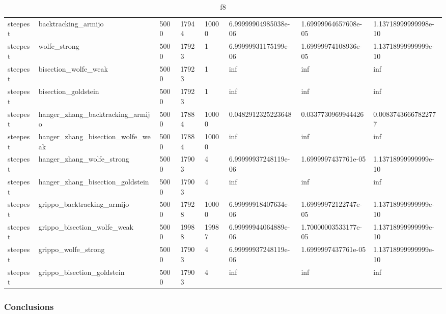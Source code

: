 \documentclass[a4paper,11pt]{article}
\numberwithin{equation}{section} %
\begin{document}
\begin{table}[h!]
{\begin{tabular}{|l|l|l|l|l|l|l|l|}
        steepest & backtracking\_armijo & 5000 & 17944 & 10000 & 6.99999904985038e-06 & 1.69999964657608e-05 & 1.13718999999998e-10 \\
        steepest & wolfe\_strong & 5000 & 17923 & 1 & 6.99999931175199e-06 & 1.69999974108936e-05 & 1.13718999999999e-10 \\
        steepest & bisection\_wolfe\_weak & 5000 & 17923 & 1 & inf & inf & inf \\
        steepest & bisection\_goldstein & 5000 & 17923 & 1 & inf & inf & inf \\
        steepest & hanger\_zhang\_backtracking\_armijo & 5000 & 17884 & 10000 & 0.0482912325223648 & 0.0337730969944426 & 0.00837436667822777 \\
        steepest & hanger\_zhang\_bisection\_wolfe\_weak & 5000 & 17884 & 10000 & inf & inf & inf \\
        steepest & hanger\_zhang\_wolfe\_strong & 5000 & 17903 & 4 & 6.99999937248119e-06 & 1.6999997437761e-05 & 1.13718999999999e-10 \\
        steepest & hanger\_zhang\_bisection\_goldstein & 5000 & 17903 & 4 & inf & inf & inf \\
        steepest & grippo\_backtracking\_armijo & 5000 & 17928 & 10000 & 6.99999918407634e-06 & 1.69999972122747e-05 & 1.13718999999999e-10 \\
        steepest & grippo\_bisection\_wolfe\_weak & 5000 & 19988 & 19987 & 6.99999944064889e-06 & 1.70000003533177e-05 & 1.13718999999999e-10 \\
        steepest & grippo\_wolfe\_strong & 5000 & 17903 & 4 & 6.99999937248119e-06 & 1.6999997437761e-05 & 1.13718999999999e-10 \\
        steepest & grippo\_bisection\_goldstein & 5000 & 17903 & 4 & inf & inf & inf \\
\end{tabular}}
\caption{f8}
\label{table:f8}
\end{table}

\clearpage


\subsubsection{Conclusions}
\end{document}
